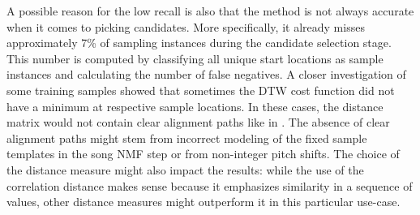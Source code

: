 \documentclass{article}
\begin{document}
A possible reason for the low recall is also that the method is not always accurate when it comes to picking candidates. More specifically, it already misses approximately 7\% of sampling instances during the candidate selection stage. This number is computed by classifying all unique start locations as sample instances and calculating the number of false negatives. A closer investigation of some training samples showed that sometimes the DTW cost function did not have a minimum at respective sample locations. In these cases, the distance matrix would not contain clear alignment paths like in . %
%
The absence of clear alignment paths might stem from incorrect modeling of the fixed sample templates in the song NMF step or from non-integer pitch shifts. The choice of the distance measure might also impact the results: while the use of the correlation distance makes sense because it emphasizes similarity in a sequence of values, other distance measures might outperform it in this particular use-case.
\end{document}

